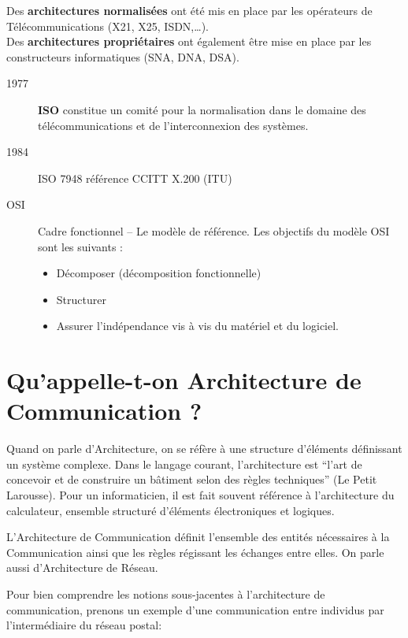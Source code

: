 	Des \textbf{architectures normalisées} ont été mis en place par les opérateurs de Télécommunications (X21, X25, ISDN,\ldots).\\
	Des \textbf{architectures propriétaires} ont également être mise en place par les constructeurs informatiques (SNA, DNA, DSA).\\
	\begin{description}
		\item[1977] \textbf{ISO} constitue un comité pour la normalisation dans le domaine des télécommunications et de l'interconnexion des systèmes.\\
		\item[1984] ISO 7948 référence CCITT X.200 (ITU)
		\item[OSI] Cadre fonctionnel -- Le modèle de référence. Les objectifs du modèle OSI sont les suivants : 
			\begin{itemize}
				\item Décomposer (décomposition fonctionnelle)
				\item Structurer
				\item Assurer l'indépendance vis à vis du matériel et du logiciel.
			\end{itemize}
	\end{description}

	\section{Qu'appelle-t-on Architecture de Communication ?}
Quand on parle d'Architecture, on se réfère à une structure d'éléments définissant un système complexe. Dans le langage courant, l'architecture est ``l'art de concevoir et de construire un bâtiment selon des règles techniques'' (Le Petit Larousse). Pour un informaticien, il est fait souvent référence à l'architecture du calculateur, ensemble structuré d'éléments électroniques et logiques.

L'Architecture de Communication définit l'ensemble des entités nécessaires à la Communication ainsi que les règles régissant les échanges entre elles. On parle aussi d'Architecture de Réseau.

Pour bien comprendre les notions sous-jacentes à l'architecture de communication, prenons un exemple d'une communication entre individus par l'intermédiaire du réseau postal:

